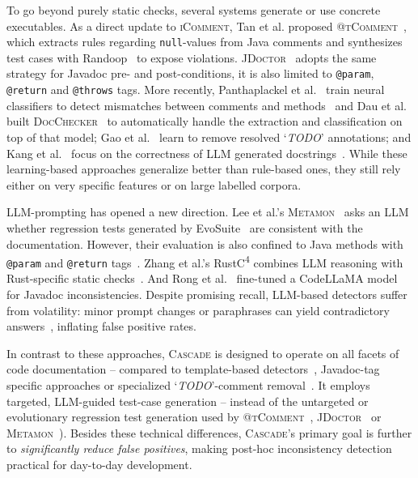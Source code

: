 \documentclass[acmsmall, screen]{acmart}
\newcommand{\tool}{\textsc{Cascade}\xspace}
\begin{document}
To go beyond purely static checks, several systems generate or use concrete executables.  
As a direct update to \textsc{iComment}, Tan et al. proposed \textsc{@tComment}~\cite{tan2012tcomment}, which extracts rules regarding \texttt{null}-values from Java comments and synthesizes test cases with Randoop~\cite{randoop} to expose violations.  
\textsc{JDoctor}~\cite{jdoctor} adopts the same strategy for Javadoc pre- and post-conditions, it is also limited to \texttt{@param}, \texttt{@return} and \texttt{@throws} tags.  
More recently, Panthaplackel et al.~\cite{panthaplackel2020learning} train neural classifiers to detect mismatches between comments and methods~\cite{panthaplackel2021deep} and Dau et al. built \textsc{DocChecker}~\cite{docchecker} to automatically handle the extraction and classification on top of that model; Gao et al.~\cite{gao2021automating} learn to remove resolved `\textit{TODO}' annotations; and Kang et al.~\cite{sungmin} focus on the correctness of LLM generated docstrings~\cite{sungmin}.  
While these learning-based approaches generalize better than rule-based ones, they still rely either on very specific features or on large labelled corpora.

LLM-prompting has opened a new direction.  
Lee et al.'s \textsc{Metamon}~\cite{metamon} asks an LLM whether regression tests generated by EvoSuite~\cite{evosuite} are consistent with the documentation.
However, their evaluation is also confined to Java methods with \texttt{@param} and \texttt{@return} tags~\cite{metamon}.  
Zhang et al.'s RustC\textsuperscript{4} combines LLM reasoning with Rust-specific static checks~\cite{rustc4}. And Rong et al.~\cite{carlama} fine-tuned a CodeLLaMA model for Javadoc inconsistencies. 
Despite promising recall, LLM-based detectors suffer from volatility: minor prompt changes or paraphrases can yield contradictory answers~\cite{ye2023assessing, huang2025survey}, inflating false positive rates. 

In contrast to these approaches, \tool is designed to operate on all facets of code documentation -- compared to template-based detectors~\cite{sondhi2019segate}, Javadoc-tag specific approaches \cite{tan2012tcomment, jdoctor, metamon, carlama} or specialized `\textit{TODO}'-comment removal~\cite{gao2021automating}. It employs targeted, LLM-guided test-case generation -- instead of the untargeted or evolutionary regression test generation used by \textsc{@tComment}~\cite{tan2012tcomment}, \textsc{JDoctor}~\cite{jdoctor} or \textsc{Metamon}~\cite{metamon}). 
Besides these technical differences, \tool's primary goal is further to \emph{significantly reduce false positives}, making post-hoc inconsistency detection practical for day-to-day development.
\end{document}
